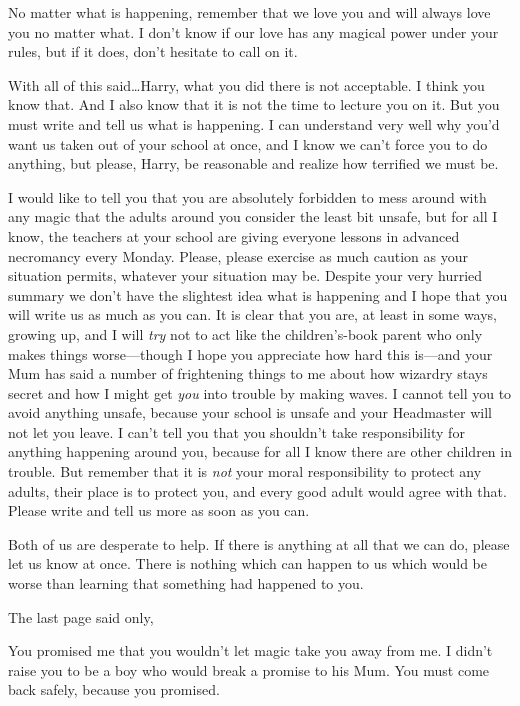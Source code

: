 \begin{writtenNote}
No matter what is happening, remember that we love you and will always love you no matter what. I don’t know if our love has any magical power under your rules, but if it does, don’t hesitate to call on it.

With all of this said…Harry, what you did there is not acceptable. I think you know that. And I also know that it is not the time to lecture you on it. But you must write and tell us what is happening. I can understand very well why you’d want us taken out of your school at once, and I know we can’t force you to do anything, but please, Harry, be reasonable and realize how terrified we must be.

I would like to tell you that you are absolutely forbidden to mess around with any magic that the adults around you consider the least bit unsafe, but for all I know, the teachers at your school are giving everyone lessons in advanced necromancy every Monday. Please, please exercise as much caution as your situation permits, whatever your situation may be. Despite your very hurried summary we don’t have the slightest idea what is happening and I hope that you will write us as much as you can. It is clear that you are, at least in some ways, growing up, and I will \emph{try} not to act like the children’s-book parent who only makes things worse—though I hope you appreciate how hard this is—and your Mum has said a number of frightening things to me about how wizardry stays secret and how I might get \emph{you} into trouble by making waves. I cannot tell you to avoid anything unsafe, because your school is unsafe and your Headmaster will not let you leave. I can’t tell you that you shouldn’t take responsibility for anything happening around you, because for all I know there are other children in trouble. But remember that it is \emph{not} your moral responsibility to protect any adults, their place is to protect you, and every good adult would agree with that. Please write and tell us more as soon as you can.

Both of us are desperate to help. If there is anything at all that we can do, please let us know at once. There is nothing which can happen to us which would be worse than learning that something had happened to you.

\end{writtenNote}

The last page said only,

\begin{writtenNote}
You promised me that you wouldn’t let magic take you away from me. I didn’t raise you to be a boy who would break a promise to his Mum. You must come back safely, because you promised.

\end{writtenNote}

